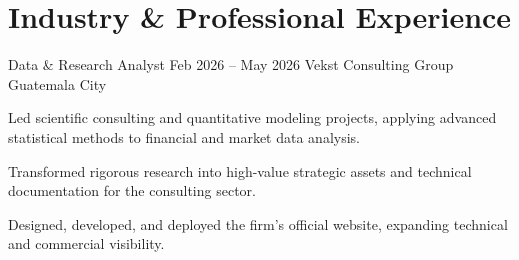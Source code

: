 \section{Industry \& Professional Experience}

\resumeExpEntry
    {Data \& Research Analyst}
    {Feb 2026 – May 2026}
    {Vekst Consulting Group}
    {Guatemala City}
    {}
    {
        \item Led scientific consulting and quantitative modeling projects, applying advanced statistical methods to financial and market data analysis.
        \item Transformed rigorous research into high-value strategic assets and technical documentation for the consulting sector.
        \item Designed, developed, and deployed the firm's official website, expanding technical and commercial visibility.
    }
